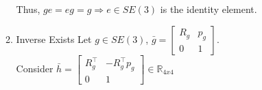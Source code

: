 \documentclass[12pt]{article}
\newcommand{\R}{\mathbb{R}}
\begin{document}
\begin{enumerate}
\begin{enumerate}
                        Thus, $ge = eg = g \Rightarrow e \in SE(3)$ is the identity element.
                        
                    \item Inverse Exists
                        Let $g \in SE(3)$, $\bar{g} = \begin{bmatrix} 
                                                R_g & p_g \\ 
                                                0 & 1
                                                \end{bmatrix}$. \\
                        Consider $\bar{h} = \begin{bmatrix} 
                                                R_g^\top & -R_g^\top p_g \\ 
                                                0 & 1
                                                \end{bmatrix} \in \R_{4x4}$\\
                                    

\end{enumerate}
\end{enumerate}
\end{document}
